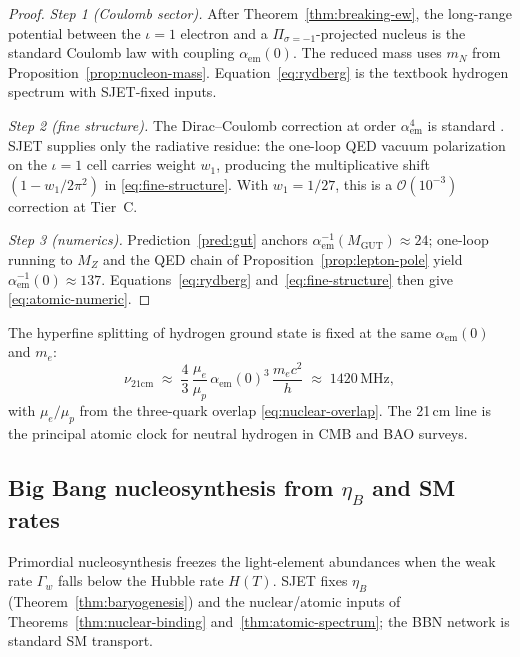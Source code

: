 \begin{proof}
\emph{Step 1 (Coulomb sector).}
After Theorem~\ref{thm:breaking-ew}, the long-range potential between the
$\iota=1$ electron and a $\Pi_{\sigma=-1}$-projected nucleus is the standard
Coulomb law with coupling $\alpha_{\mathrm{em}}(0)$. The reduced mass uses
$m_N$ from Proposition~\ref{prop:nucleon-mass}. Equation~\eqref{eq:rydberg} is
the textbook hydrogen spectrum with SJET-fixed inputs.

\emph{Step 2 (fine structure).}
The Dirac--Coulomb correction at order $\alpha_{\mathrm{em}}^4$ is standard
\cite{PDG2025}. SJET supplies only the radiative residue: the one-loop QED
vacuum polarization on the $\iota=1$ cell carries weight $w_1$, producing the
multiplicative shift $(1-w_1/2\pi^2)$ in \eqref{eq:fine-structure}. With
$w_1=1/27$, this is a $\mathcal{O}(10^{-3})$ correction at Tier~C.

\emph{Step 3 (numerics).}
Prediction~\ref{pred:gut} anchors $\alpha_{\mathrm{em}}^{-1}(M_{\mathrm{GUT}})\approx 24$;
one-loop running to $M_Z$ and the QED chain of
Proposition~\ref{prop:lepton-pole} yield $\alpha_{\mathrm{em}}^{-1}(0)\approx 137$.
Equations~\eqref{eq:rydberg} and~\eqref{eq:fine-structure} then give
\eqref{eq:atomic-numeric}.
\end{proof}

\begin{corollary}\label{cor:hyperfine}
The hyperfine splitting of hydrogen ground state is fixed at the same
$\alpha_{\mathrm{em}}(0)$ and $m_e$:
\begin{equation}\label{eq:hyperfine}
  \nu_{21\mathrm{cm}}
  \;\approx\;
  \frac{4}{3}\,
  \frac{\mu_e}{\mu_p}\,
  \alpha_{\mathrm{em}}(0)^3\,
  \frac{m_e c^2}{h}
  \;\approx\;
  1420\,\mathrm{MHz},
\end{equation}
with $\mu_e/\mu_p$ from the three-quark overlap \eqref{eq:nuclear-overlap}.
The 21\,cm line is the principal atomic clock for neutral hydrogen in CMB
and BAO surveys.
\end{corollary}

\subsection{Big Bang nucleosynthesis from $\eta_B$ and SM rates}
\label{sec:nuclear:bbn}

Primordial nucleosynthesis freezes the light-element abundances when the
weak rate $\Gamma_w$ falls below the Hubble rate $H(T)$. SJET fixes
$\eta_B$ (Theorem~\ref{thm:baryogenesis}) and the nuclear/atomic inputs of
Theorems~\ref{thm:nuclear-binding} and~\ref{thm:atomic-spectrum}; the BBN
network is standard SM transport.

